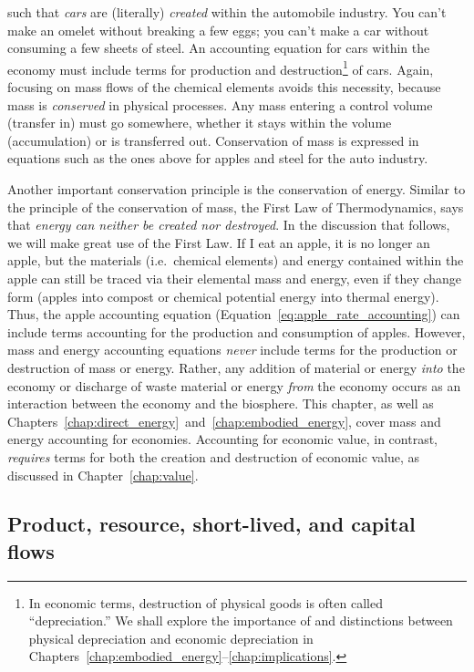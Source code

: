 such that \emph{cars} are (literally) \emph{created}
within the automobile industry. 
You can't make an omelet without breaking a few eggs;
you can't make a car without consuming a few sheets of steel.
An accounting equation for cars within the economy
must include terms for production and destruction\footnote{In economic terms,
destruction of physical goods is often called ``depreciation.'' We shall 
explore the importance of and distinctions between 
physical depreciation and economic depreciation 
in Chapters~\ref{chap:embodied_energy}--\ref{chap:implications}.}
of cars.
Again, focusing on mass flows of the chemical elements avoids this necessity, 
because mass is \emph{conserved} in physical processes.
Any mass entering a control volume (transfer in) 
must go somewhere, 
whether it stays within the volume (accumulation) 
or is transferred out.
Conservation of mass is expressed in equations such as the ones above
for apples and steel for the auto industry. 

Another important conservation principle is the conservation of energy.
Similar to the principle of the conservation of mass,
the First Law of Thermodynamics,
says that \emph{energy can neither be created nor destroyed}. 
In the discussion that follows, we will make great use 
of the First Law.
If I eat an apple, it is no longer an apple, 
but the materials (i.e.\ chemical elements) 
and energy contained
within the apple can still be traced 
via their elemental mass and energy,
even if they change form (apples into compost or 
chemical potential energy into thermal energy).
Thus, the apple accounting equation
(Equation~\ref{eq:apple_rate_accounting}) 
can include terms accounting for the production 
and consumption of apples. 
However, 
mass and energy accounting equations 
\emph{never} include terms for the 
production or destruction of mass or energy. 
Rather, any addition of material or energy 
\emph{into} the economy
or discharge of waste material or energy 
\emph{from} the economy
occurs as an interaction between 
the economy and the biosphere.
This chapter, as well as 
Chapters~\ref{chap:direct_energy}~and~\ref{chap:embodied_energy},
cover mass and energy
accounting for economies.
Accounting for economic value, in contrast, 
\emph{requires} terms for both the creation
and destruction of economic value,
as discussed in Chapter~\ref{chap:value}.


\subsection{Product, resource, short-lived, and capital flows}

